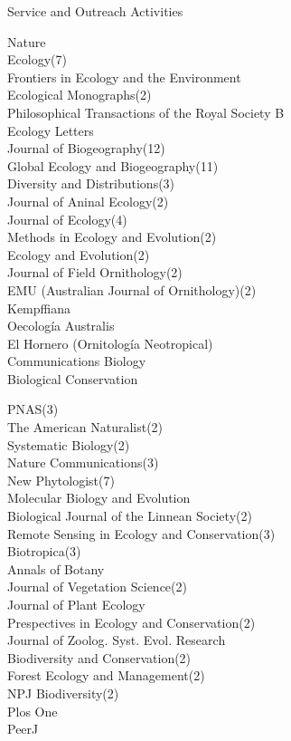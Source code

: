 \documentclass{resume} %
\begin{document}
\begin{rSection}{Service and Outreach Activities}
\begin{multicols}{2}
Nature \\
Ecology(7) \\
Frontiers in Ecology and the Environment \\
Ecological Monographs(2) \\ 
Philosophical Transactions of the Royal Society B \\
Ecology Letters \\
Journal of Biogeography(12) \\ 
Global Ecology and Biogeography(11) \\
Diversity and Distributions(3) \\ 
Journal of Aninal Ecology(2) \\
Journal of Ecology(4) \\ 
Methods in Ecology and Evolution(2) \\ 
Ecology and Evolution(2) \\ 
Journal of Field Ornithology(2) \\
EMU (Australian Journal of Ornithology)(2) \\ 
Kempffiana \\ 
Oecología Australis \\
El Hornero (Ornitología Neotropical) \\ 
Communications Biology \\
Biological Conservation \smallskip

\columnbreak

PNAS(3) \\
The American Naturalist(2) \\ 
Systematic Biology(2) \\
Nature Communications(3) \\
New Phytologist(7) \\ 
Molecular Biology and Evolution \\ 
Biological Journal of the Linnean Society(2) \\
Remote Sensing in Ecology and Conservation(3) \\ 
Biotropica(3) \\ 
Annals of Botany \\ 
Journal of Vegetation Science(2) \\ 
Journal of Plant Ecology \\ 
Prespectives in Ecology and Conservation(2) \\
Journal of Zoolog. Syst. Evol. Research \\
Biodiversity and Conservation(2) \\
Forest Ecology and Management(2) \\ 
NPJ Biodiversity(2) \\
Plos One \\
PeerJ \smallskip


\end{multicols}
\end{rSection}
\end{document}
